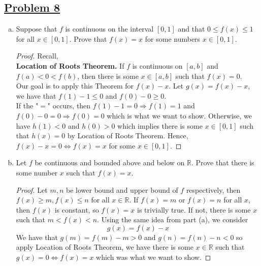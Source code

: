 \documentclass[10pt,letterpaper]{article}
\begin{document}
	\subsection*{{\color{purple}\underline{Problem 8}}}
	\text{ }
	\begin{enumerate}[(a)]
		\item Suppose that $f$ is continuous on the interval $[0, 1]$ and that $0 \leq f(x) \leq 1$ for 
		all $x \in [0, 1]$. Prove that $f(x) = x$ for some numbers $x \in [0, 1]$.
		\begin{proof}
		Recall, \\
		\textbf{Location of Roots Theorem. } If $f$ is continuous on $[a,b]$ and $f(a) < 0 < f(b)$, then
		there is some $x \in [a, b]$ such that $f(x) = 0$. \\
		Our goal is to apply this Theorem for $f(x) - x$. Let $g(x) = f(x) - x$, we have 
		that $f(1) - 1 \leq 0$ and $f(0) - 0 \geq 0$. \\ 
		If the "$=$" occurs,
		then $f(1) - 1 = 0 \Rightarrow f(1) = 1$ and $f(0) - 0 = 0 \Rightarrow f(0) = 0$ which is
		what we want to show. Otherwise, we have $h(1) < 0$ and $h(0) > 0$ which implies
		there is some $x \in [0, 1]$ such that $h(x) = 0$ by Location of Roots Theorem. Hence,
		$f(x) - x = 0 \Leftrightarrow f(x) = x$ for some $x \in [0, 1]$. 
		\end{proof}
		
		\item Let $f$ be continuous and bounded above and below on $\mathbb{R}$. Prove that there is
		some number $x$ such that $f(x) = x$.
		\begin{proof}
			Let $m, n$ be lower bound and upper bound of $f$ respectively, then $f(x) \geq m, f(x) \leq n$
			for all $x \in \mathbb{R}$. If $f(x) = m$ or $f(x) = n$ for all $x$, then $f(x)$ is constant,
			so $f(x) = x$ is trivially true. If not, there is some $x$ such that
			$m < f(x) < n$. Using the same idea from part (a), we consider
			$$g(x) = f(x) - x$$
			We have that $g(m) = f(m) - m > 0$ and $g(n) = f(n) - n < 0$ so apply Location of Roots Theorem,
			we have there is some $x \in \mathbb{R}$ such that $g(x) = 0 \Leftrightarrow f(x) = x$ which 
			was what we want to show. 
			
			
		\end{proof}				
	\end{enumerate}
	
	
\end{document}

